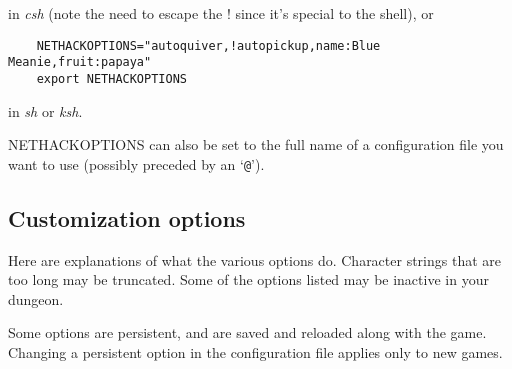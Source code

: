 \nd in {\it csh}
(note the need to escape the ! since it's special to the shell), or
\begin{verbatim}
    NETHACKOPTIONS="autoquiver,!autopickup,name:Blue Meanie,fruit:papaya"
    export NETHACKOPTIONS
\end{verbatim}

\nd in {\it sh\/} or {\it ksh}.

NETHACKOPTIONS can also be set to the full name of a configuration file you
want to use (possibly preceded by an `{\tt @}').

\subsection*{Customization options}

Here are explanations of what the various options do.
Character strings that are too long may be truncated.
Some of the options listed may be inactive in your dungeon.

Some options are persistent, and are saved and reloaded along with
the game.  Changing a persistent option in the configuration file
applies only to new games.

